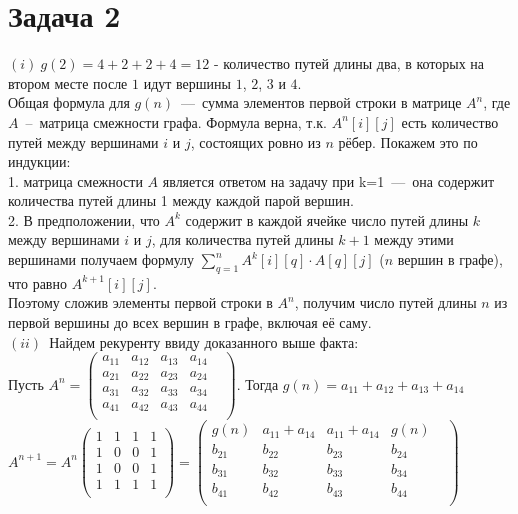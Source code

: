 \documentclass[a4paper,12pt]{article} %
\begin{document}
 \section*{Задача 2}
$(i)~ g(2) = 4 + 2 + 2 + 4 = 12 $ - количество путей длины два, в которых на втором месте после $1$ идут вершины $1$, $2$, $3$ и $4$.\\
 Общая формула для $g(n)$~---~сумма элементов первой строки в  матрице $A^n$, где $A$~--~матрица смежности графа. Формула верна, т.к. $A^n[i][j]$ есть количество путей между вершинами $i$ и $j$, состоящих ровно из $n$ рёбер. Покажем это по индукции:\\
 1. матрица смежности $A$ является ответом на задачу при k=1~---~она содержит количества путей длины 1 между каждой парой вершин. \\
 2. В предположении, что $A^{k}$ содержит в каждой ячейке число путей длины $k$ между вершинами $i$ и $j$, для количества путей длины $k+1$ между этими вершинами получаем формулу $\sum_{q=1}^{n}{A^k[i][q]\cdot A[q][j]}$ ($n$ вершин в графе), что равно $A^{k+1}[i][j]$. \\
 Поэтому сложив элементы первой строки в $A^n$, получим число путей длины $n$ из первой вершины до всех вершин в графе, включая её саму.\\
 $(ii)$~Найдем рекуренту ввиду доказанного выше факта:\\
 Пусть $A^n = \begin{pmatrix}
 a_{11}&a_{12}&a_{13}&a_{14}&\\
 a_{21}&a_{22}&a_{23}&a_{24}&\\
 a_{31}&a_{32}&a_{33}&a_{34}&\\
 a_{41}&a_{42}&a_{43}&a_{44}&\\
 \end{pmatrix}$. Тогда $g(n) = a_{11}+a_{12}+a_{13}+a_{14}$\\
 
 
 $A^{n+1} = A^n\begin{pmatrix}
 1&1&1&1\\
 1&0&0&1\\
 1&0&0&1\\
 1&1&1&1\\
 \end{pmatrix} = \begin{pmatrix}
 g(n)&a_{11} + a_{14}& a_{11} + a_{14}&g(n)&\\
 b_{21}&b_{22}&b_{23}&b_{24}&\\
 b_{31}&b_{32}&b_{33}&b_{34}&\\
 b_{41}&b_{42}&b_{43}&b_{44}&\\
 \end{pmatrix}$\\
 
\end{document}
